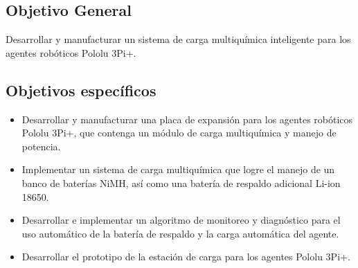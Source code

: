 \subsection*{Objetivo General}

Desarrollar y manufacturar un sistema de carga multiquímica inteligente para los agentes robóticos 
Pololu 3Pi+.

\subsection*{Objetivos específicos}


\begin{itemize}
    \item Desarrollar y manufacturar una placa de expansión para los 
    agentes robóticos Pololu 3Pi+, que contenga un módulo de carga multiquímica
    y manejo de potencia.
    \item Implementar un sistema de carga multiquímica que logre el manejo de 
    un banco de baterías NiMH, así como una batería de respaldo adicional Li-ion 18650.
    \item  Desarrollar e implementar un algoritmo de monitoreo y diagnóstico para el uso
    automático de la batería de respaldo y la carga automática del agente. 
    \item Desarrollar el prototipo de la estación de carga para los agentes Pololu 3Pi+.

\end{itemize}